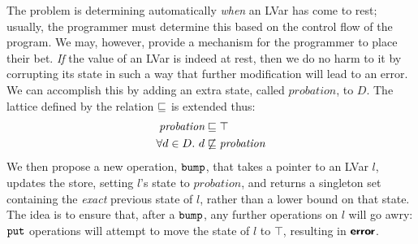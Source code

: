 The problem is determining automatically {\em when} an LVar has come to rest;
usually, the programmer must determine this based on the control flow of the
program.  We may, however, provide a mechanism for the programmer to place their bet.
{\em If} the value
of an LVar is indeed at rest, then we do no harm to it by
corrupting its state in such a way that further modification will lead to an
error.  We can accomplish this by adding an extra state, called
$\textit{probation}$, to $D$.  The lattice defined by the relation
$\sqsubseteq$ is extended thus:
%
\begin{align*}
\textit{probation} &\sqsubseteq \top \\
\forall d \in D.~d &\not \sqsubseteq \textit{probation}
\end{align*}
\noindent
We then propose a new operation, $\mbox{\texttt{bump}}$, that takes a pointer to an LVar $l$, updates the store, setting $l$'s state to $\textit{probation}$, and returns a singleton
  set containing the {\em exact} previous state of $l$, rather than a lower bound on that state.
The idea is to ensure that, after a $\mbox{\texttt{bump}}$, any further operations 
on $l$ will go awry:
$\mbox{\texttt{put}}$ operations will
attempt to move the state of $l$ to $\top$, 
resulting in $\textbf{\textsf{error}}$.






